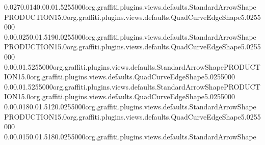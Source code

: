 0.0270.0140.00.01.5255000org.graffiti.plugins.views.defaults.StandardArrowShapePRODUCTION15.0org.graffiti.plugins.views.defaults.QuadCurveEdgeShape5.0255000 0.00.0250.01.5190.0255000org.graffiti.plugins.views.defaults.StandardArrowShapePRODUCTION15.0org.graffiti.plugins.views.defaults.QuadCurveEdgeShape5.0255000 0.00.01.5255000org.graffiti.plugins.views.defaults.StandardArrowShapePRODUCTION15.0org.graffiti.plugins.views.defaults.QuadCurveEdgeShape5.0255000 0.00.01.5255000org.graffiti.plugins.views.defaults.StandardArrowShapePRODUCTION15.0org.graffiti.plugins.views.defaults.QuadCurveEdgeShape5.0255000 0.00.0180.01.5120.0255000org.graffiti.plugins.views.defaults.StandardArrowShapePRODUCTION15.0org.graffiti.plugins.views.defaults.QuadCurveEdgeShape5.0255000 0.00.0150.01.5180.0255000org.graffiti.plugins.views.defaults.StandardArrowShape